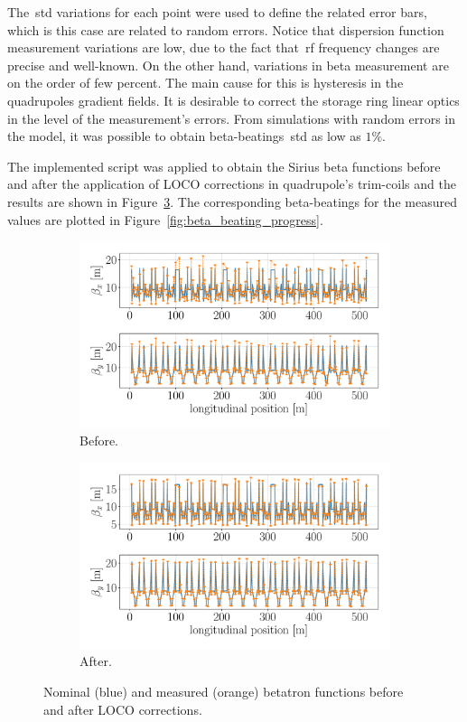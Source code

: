 The~\gls{std} variations for each point were used to define the related error bars, which is this case are related to random errors. Notice that dispersion function measurement variations are low, due to the fact that~\gls{rf} frequency changes are precise and well-known. On the other hand, variations in beta measurement are on the order of few percent. The main cause for this is hysteresis in the quadrupoles gradient fields. It is desirable to correct the storage ring linear optics in the level of the measurement's errors. From simulations with random errors in the model, it was possible to obtain beta-beatings~\gls{std} as low as $1\%$.

The implemented script was applied to obtain the Sirius beta functions before and after the application of LOCO corrections in quadrupole's trim-coils and the results are shown in Figure~\ref{fig:beta_tuneshift}. The corresponding beta-beatings for the measured values are plotted in Figure~\ref{fig:beta_beating_progress}.
\begin{figure}
\centering
\begin{subfigure}[t]{0.49\textwidth}
\includegraphics[width=1.0\textwidth]{figures/beta_before_big.pdf}
    \caption{Before.}
    \label{subfig:beta_before}
\end{subfigure}
 \begin{subfigure}[t]{0.49\textwidth}
\includegraphics[width=1.0\textwidth]{figures/beta_after_big.pdf}
    \caption{After.}
    \label{subfig:beta_after}
\end{subfigure}
\caption{Nominal (blue) and measured (orange) betatron functions before and after LOCO corrections.}
\label{fig:beta_tuneshift}
\end{figure}
